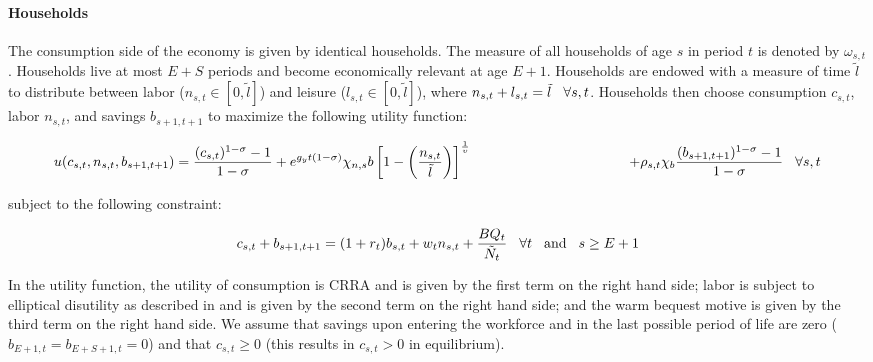 \documentclass[10pt]{article}
\numberwithin{equation}{subsection}
\begin{document}
\begin{appendices}

\paragraph{Households}

The consumption side of the economy is given by identical households. The measure of all households of age \(s\) in period \(t\) is denoted by \(\omega_{s,t}\). Households live at most \(E+S\) periods and become economically relevant at age \(E+1\). Households are endowed with a measure of time \(\tilde{l}\) to distribute between labor (\(n_{s,t} \in [0,\tilde{l}]\)) and leisure (\(l_{s,t} \in [0,\tilde{l}]\)), where \(n_{s,t} + l_{s,t} = \tilde{l} \hspace{3mm} \forall s, t\). Households then choose consumption \(c_{s,t}\), labor \(n_{s,t}\), and savings \(b_{s+1,t+1}\) to maximize the following utility function:

\begin{dmath}
   {u(c_{s,t}, n_{s,t}, b_{s+1,t+1}) = \frac{(c_{s,t})^{1-\sigma}-1}{1-\sigma} + e^{g_yt(1-\sigma)}\chi_{n,s}b\left[1-\left(\frac{n_{s,t}}{\tilde{l}}\right)\right]^{\frac{1}{\upsilon}}} \\
   {\hspace{40mm} + \rho_{s,t}\chi_b\frac{(b_{s+1,t+1})^{1-\sigma}-1}{1-\sigma} \hspace{3mm} \forall s,t}
\end{dmath}

\par subject to the following constraint:

\begin{equation}
   c_{s,t} + b_{s+1,t+1} = (1+r_t)b_{s,t} + w_tn_{s,t} + \frac{BQ_t}{\tilde{N}_t} \hspace{3mm} \forall t \hspace{3mm} \text{and} \hspace{3mm} s \geq E+1
\end{equation}

\par In the utility function, the utility of consumption is CRRA and is given by the first term on the right hand side; labor is subject to elliptical disutility as described in \cite{DE2018} and is given by the second term on the right hand side; and the warm bequest motive is given by the third term on the right hand side. We assume that savings upon entering the workforce and in the last possible period of life are zero (\(b_{E+1,t} = b_{E+S+1,t} = 0\)) and that \(c_{s,t} \geq 0\) (this results in \(c_{s,t} > 0\) in equilibrium).


\end{appendices}
\end{document}
